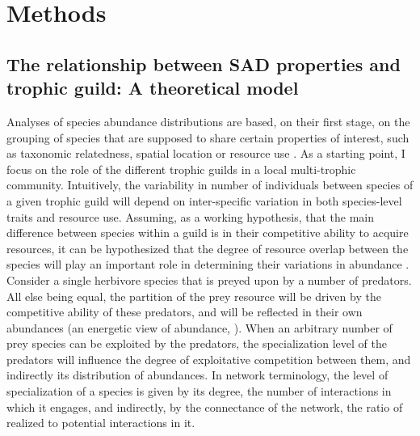 \section*{Methods}

\subsection*{The relationship between SAD properties and trophic guild: A theoretical model}

Analyses of species abundance distributions are based, on their first stage, on the grouping of species that are supposed to share certain properties of interest, such as taxonomic relatedness, spatial location or resource use \citep{Fauth1996}. As a starting point, I focus on the role of the different trophic guilds in a local multi-trophic community. Intuitively, the variability in number of individuals between species of a given trophic guild will depend on inter-specific variation in both species-level traits and resource use. Assuming, as a working hypothesis, that the main difference between species within a guild is in their competitive ability to acquire resources, it can be hypothesized that the degree of resource overlap between the species will play an important role in determining their variations in abundance \citep{Sugihara2003}. Consider a single herbivore species that is preyed upon by a number of predators. All else being equal, the partition of the prey resource will be driven by the competitive ability of these predators, and will be reflected in their own abundances (an energetic view of abundance, \citealt{Isaac2013}). When an arbitrary number of prey species can be exploited by the predators, the specialization level of the predators will influence the degree of exploitative competition between them, and indirectly its distribution of abundances. In network terminology, the level of specialization of a species is given by its degree, the number of interactions in which it engages, and indirectly, by the connectance of the network, the ratio of realized to potential interactions in it.

